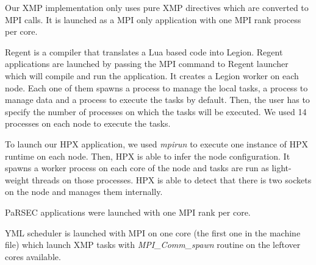 Our XMP implementation only uses pure XMP directives which are converted to MPI calls.
It is launched as a MPI only application with one MPI rank process per core.

Regent is a compiler that translates a Lua based code into Legion.
Regent applications are launched by passing the MPI command to Regent launcher which will compile and run the application.
It creates a Legion worker on each node.
Each one of them spawns a process to manage the local tasks, a process to manage data and a process to execute the tasks by default.
Then, the user has to specify the number of processes on which the tasks will be executed.
We used 14 processes on each node to execute the tasks.

To launch our HPX application, we used \textit{mpirun} to execute one instance of HPX runtime on each node.
Then, HPX is able to infer the node configuration.
It spawns a worker process on each core of the node and tasks are run as light-weight threads on those processes.
HPX is able to detect that there is two sockets on the node and manages them internally.

PaRSEC applications were launched with one MPI rank per core.

YML scheduler is launched with MPI on one core (the first one in the machine file) which launch XMP tasks with \textit{MPI\_Comm\_spawn} routine on the leftover cores available.


